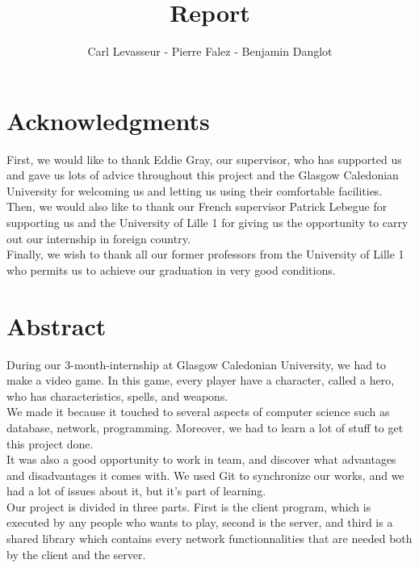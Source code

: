 \documentclass{scrreprt}
\author{Carl Levasseur - Pierre Falez - Benjamin Danglot}
\title{Report}
\begin{document}
\maketitle{}

\chapter*{Acknowledgments} %
First, we would like to thank Eddie Gray, our supervisor, who has supported us and
gave us lots of advice throughout this project and the Glasgow Caledonian University for
welcoming us and letting us using their comfortable facilities.\\

	  Then, we would also like to thank our French supervisor Patrick Lebegue for supporting us
	  and the University of Lille 1 for giving us the opportunity to carry out our internship in foreign country.\\

	  Finally, we wish to thank all our former professors from the University of Lille 1 who
	  permits us to achieve our graduation in very good conditions.\\

	  \chapter*{Abstract}
	  During our 3-month-internship at Glasgow Caledonian University, we had to make a video game.
	  In this game, every player have a character, called a hero, who has characteristics, spells, and weapons.\\

	  We made it because it touched to several aspects of computer science such as database, network,
	  programming. Moreover, we had to learn a lot of stuff to get this project done.\\
		  It was also a good opportunity to work in team, and discover what advantages and disadvantages it comes with.
		  We used Git to synchronize our works, and we had a lot of issues about it, but it's part of learning.\\

		  Our project is divided in three parts. First is the client program, which is executed by any people who wants to play,
		  second is the server, and third is a shared library which contains every network functionnalities that are needed both
		  by the client and the server.\\
\end{document}
